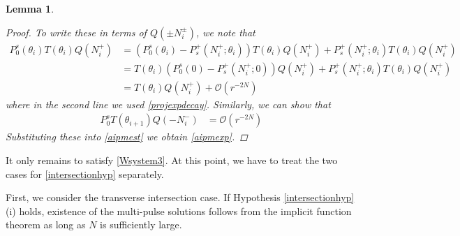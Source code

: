 \documentclass[12pt]{article}
\newtheorem{lemma}{Lemma}
\begin{document}
\begin{lemma}
\begin{proof}
To write these in terms of $Q(\pm N_i^\pm)$, we note that
\begin{align*}
P_0^s(\theta_i) T(\theta_i) Q(N_i^+) &= (P_0^s(\theta_i) - P_s^+(N_i^+; \theta_i)) T(\theta_i) Q(N_i^+) + P_s^+(N_i^+; \theta_i) T(\theta_i) Q(N_i^+) \\
&= T(\theta_i)(P_0^s(0) - P_s^+(N_i^+; 0)) Q(N_i^+) + P_s^+(N_i^+; \theta_i) T(\theta_i) Q(N_i^+) \\
&= T(\theta_i) Q(N_i^+) + \mathcal{O}(r^{-2N}) 
\end{align*}
where in the second line we used \eqref{projexpdecay}. Similarly, we can show that 
\begin{align*}
P_0^s T(\theta_{i+1}) Q(-N_i^-) &= \mathcal{O}(r^{-2N})
\end{align*}
Substituting these into \eqref{aipmest} we obtain \eqref{aipmexp}.
\end{proof}
\end{lemma}

It only remains to satisfy \eqref{Wsystem3}. At this point, we have to treat the two cases for \ref{intersectionhyp} separately.

First, we consider the transverse intersection case. If  Hypothesis \ref{intersectionhyp}(i) holds, existence of the multi-pulse solutions follows from the implicit function theorem as long as $N$ is sufficiently large.
\end{document}
